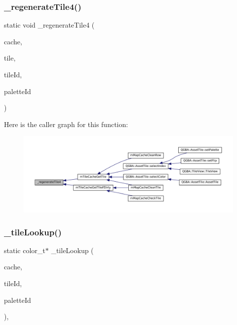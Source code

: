 \subsubsection{\texorpdfstring{\+\_\+regenerate\+Tile4()}{\_regenerateTile4()}}
{\footnotesize\ttfamily static void \+\_\+regenerate\+Tile4 (\begin{DoxyParamCaption}\item[{struct m\+Tile\+Cache $\ast$}]{cache,  }\item[{color\+\_\+t $\ast$}]{tile,  }\item[{unsigned}]{tile\+Id,  }\item[{unsigned}]{palette\+Id }\end{DoxyParamCaption})\hspace{0.3cm}{\ttfamily [static]}}

Here is the caller graph for this function\+:
\nopagebreak
\begin{figure}[H]
\begin{center}
\leavevmode
\includegraphics[width=350pt]{tile-cache_8c_a2ce7618147b6635261531801824ce86c_icgraph}
\end{center}
\end{figure}
\mbox{\label{tile-cache_8c_a643519288c92eb6c00a5f6694984f6d0}} 
\subsubsection{\texorpdfstring{\+\_\+tile\+Lookup()}{\_tileLookup()}}
{\footnotesize\ttfamily static color\+\_\+t$\ast$ \+\_\+tile\+Lookup (\begin{DoxyParamCaption}\item[{struct m\+Tile\+Cache $\ast$}]{cache,  }\item[{unsigned}]{tile\+Id,  }\item[{unsigned}]{palette\+Id }\end{DoxyParamCaption})\hspace{0.3cm}{\ttfamily [inline]}, {\ttfamily [static]}}

